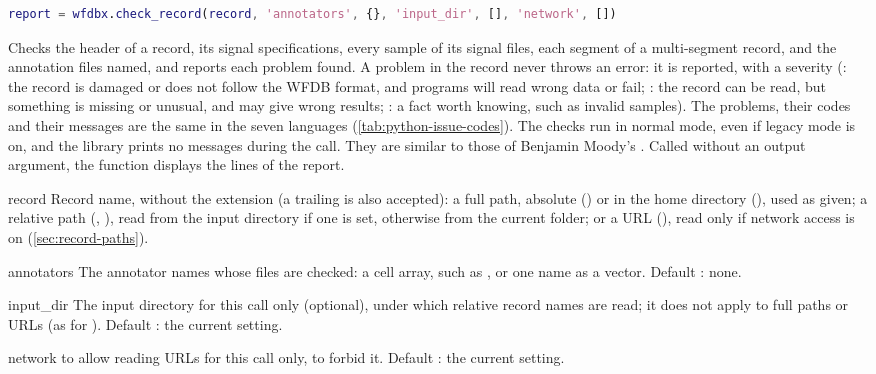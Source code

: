 \begin{lstlisting}[language=Matlab,style=signature]
report = wfdbx.check_record(record, 'annotators', {}, 'input_dir', [], 'network', [])
\end{lstlisting}
Checks the header of a record, its signal specifications, every sample of its signal
files, each segment of a multi-segment record, and the annotation files named, and
reports each problem found. A problem in the record never throws an error: it is
reported, with a severity (: the record is damaged or does not follow the
WFDB format, and programs will read wrong data or fail; : the record can
be read, but something is missing or unusual, and may give wrong results; :
a fact worth knowing, such as invalid samples). The problems, their codes and their
messages are the same in the seven languages (\cref{tab:python-issue-codes}). The checks
run in normal mode, even if legacy mode is on, and the library prints no messages during
the call. They are similar to those of Benjamin Moody's . Called without
an output argument, the function displays the lines of the report.
\begin{params}
\item[record] Record name, without the  extension (a trailing 
  is also accepted): a full path, absolute () or in the home
  directory (), used as given; a relative path
  (, ), read from the input directory if one is set,
  otherwise from the current folder; or a URL
  (), read only if network access is
  on (\cref{sec:record-paths}).
\item[annotators] The annotator names whose files are checked: a cell array, such as
  , or one name as a  vector. Default \code{\{\}}: none.
\item[input\_dir] The input directory for this call only (optional), under which
  relative record names are read; it does not apply to full paths or URLs (as for
  ). Default \code{[]}: the current setting.
\item[network]  to allow reading URLs for this call only,  to
  forbid it. Default \code{[]}: the current setting.
\end{params}
